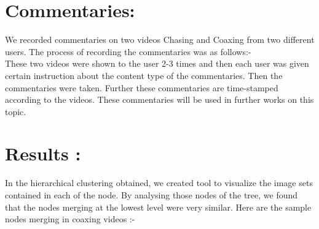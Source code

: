 \documentclass[11pt]{report}
\begin{document}
\section*{Commentaries: } We recorded commentaries on two videos Chasing and Coaxing from two different users. The process of recording the commentaries was as follows:-\\
\hspace*{10pt} These two videos were shown to the user 2-3 times and then each user was given certain instruction about the content type of the commentaries. Then the commentaries were taken. Further these commentaries are time-stamped according to the videos. These commentaries will be used in further works on this topic.
\section*{Results :} In the hierarchical clustering obtained, we created tool to visualize the image sets contained in each of the node. By analysing those nodes of the tree, we found that the nodes merging at the lowest level were very similar. Here are the  sample nodes merging  in coaxing videos :-\\
\end{document}
